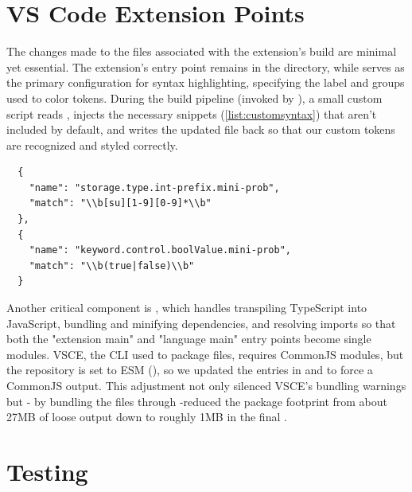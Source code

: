 \section{VS Code Extension Points}

The changes made to the files associated with the extension's build are minimal yet essential. The extension's entry point remains  in the
 directory, while  serves as the primary configuration for syntax highlighting, specifying the label and groups used to color tokens.
During the build pipeline (invoked by ), a small custom script reads , injects the necessary snippets (\ref{list:customsyntax})
that aren't included by default, and writes the updated file back so that our custom tokens are recognized and styled correctly.

\begin{verbatim}
  {
    "name": "storage.type.int-prefix.mini-prob",
    "match": "\\b[su][1-9][0-9]*\\b"
  },
  {
    "name": "keyword.control.boolValue.mini-prob",
    "match": "\\b(true|false)\\b"
  }
\end{verbatim}
\label{list:customsyntax}
\vspace{0.5em}

Another critical component is , which handles transpiling TypeScript into JavaScript, bundling and minifying dependencies, and resolving imports so
that both the "extension main" and "language main" entry points become single  modules. VSCE, the CLI used to package  files, requires CommonJS
modules, but the repository is set to ESM (), so we updated the  entries in  and
 to force a CommonJS output. This adjustment not only silenced VSCE's bundling warnings but - by bundling the files through
-reduced the package footprint from about 27MB of loose output down to roughly 1MB in the final .



\section{Testing}

